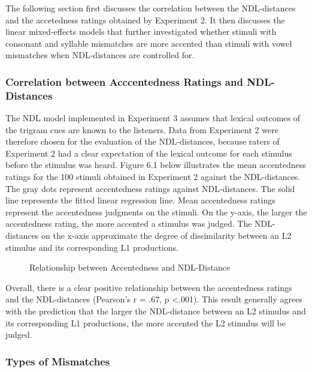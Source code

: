 The following section first discusses the correlation between the NDL-distances and the accetedness ratings obtained by Experiment 2. It then discusses the linear mixed-effects models that further investigated whether stimuli with consonant and syllable mismatches are more accented than stimuli with vowel mismatches when NDL-distances are controlled for. 

\subsubsection{Correlation between Acccentedness Ratings and NDL-Distances}

The NDL model implemented in Experiment 3 assumes that lexical outcomes of the trigram cues are known to the listeners. Data from Experiment 2 were therefore chosen for the evaluation of the NDL-distances, because raters of Experiment 2 had a clear expectation of the lexical outcome for each stimulus before the stimulus was heard. Figure 6.1 below illustrates the mean accentedness ratings for the 100 stimuli obtained in Experiment 2 against the NDL-distances. The gray dots represent accentedness ratings against NDL-distances. The solid line represents the fitted linear regression line. Mean accentedness ratings represent the accentedness judgments on the stimuli. On the y-axis, the larger the accentedness rating, the more accented a stimulus was judged. The NDL-distances on the x-axis approximate the degree of dissimilarity between an L2 stimulus and its corresponding L1 productions.

\begin{figure}[!h]
  \figSpace
    \centering
  
    \caption{Relationship between Accentedness and NDL-Distance}
    \label{fig:all}
  \figSpace
\end{figure}

Overall, there is a clear positive relationship between the accentedness ratings and the NDL-distances (Pearson’s r = .67, p <.001). This result generally agrees with the prediction that the larger the NDL-distance between an L2 stimulus and its corresponding L1 productions, the more accented the L2 stimulus will be judged.

\subsubsection{Types of Mismatches}

